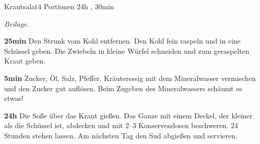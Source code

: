 \documentclass[../recipe-collections/cooking.tex]{subfiles}
\begin{document}
\begin{recipe}{Krautsalat}{4 Portionen }{24h , 30min }

  \freeform{}\textit{Beilage.}


  \textbf{25min}
  Den Strunk vom Kohl entfernen.
  Den Kohl fein raspeln und in eine Schüssel geben.
  Die Zwiebeln in kleine Würfel schneiden und zum geraspelten Kraut geben.

  \newstep{}\textbf{5min}
  Zucker, Öl, Salz, Pfeffer, Kräuteressig mit dem Mineralwasser vermischen und den Zucker gut auflösen.
  Beim Zugeben des Mineralwassers schäumt es etwas!

  \newstep{}\textbf{24h}
  Die Soße über das Kraut gießen.
  Das Ganze mit einem Deckel, der kleiner als die Schüssel ist, abdecken und mit 2–3 Konservendosen beschweren.
  24 Stunden stehen lassen.
  Am nächsten Tag den Sud abgießen und servieren.

  \freeform{}\hrulefill{}

\end{recipe}
\end{document}
